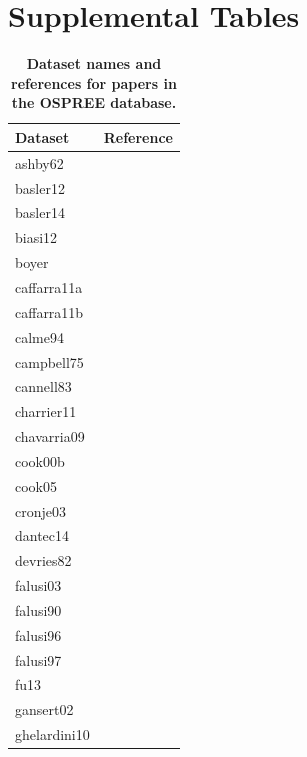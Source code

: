 \documentclass[11pt]{article}
\begin{document}
\section* {Supplemental Tables}
\begin{footnotesize} 

\begingroup\footnotesize
\begin{longtable}{p{}p{}}
\caption{\textbf{Dataset names and references for papers in the OSPREE database.}} \\ 
  \hline
Dataset & Reference \\ 
  \hline \endhead  \hline
ashby62 & \citep{Ashby:1962aa} \\ 
  basler12 & \citep{Basler:2012} \\ 
  basler14 & \citep{Basler:2014aa} \\ 
  biasi12 & \citep{Biasi:2012} \\ 
  boyer & \citep{Boyer:1986} \\ 
  caffarra11a & \citep{Caffarra:2011a} \\ 
  caffarra11b & \citep{Caffarra:2011b} \\ 
  calme94 & \citep{Calme:1994aa} \\ 
  campbell75 & \citep{Campbell:1975aa} \\ 
  cannell83 & \citep{Cannell:1983} \\ 
  charrier11 & \citep{Charrier:2011aa} \\ 
  chavarria09 & \citep{Chavarria:2009aa} \\ 
  cook00b & \citep{Cook:2000aa} \\ 
  cook05 & \citep{Cook:2005aa} \\ 
  cronje03 & \citep{Cronje:2003aa} \\ 
  dantec14 & \citep{Dantec:2014aa} \\ 
  devries82 & \citep{DeVries:1982aa} \\ 
  falusi03 & \citep{Falusi:2003aa} \\ 
  falusi90 & \citep{Falusi:1990aa} \\ 
  falusi96 & \citep{Falusi:1996aa} \\ 
  falusi97 & \citep{Falusi:1997aa} \\ 
  fu13 & \citep{Fu:2013aa} \\ 
  gansert02 & \citep{Gansert:2002aa} \\ 
  ghelardini10 & \citep{Ghelardini:2010aa} \\ 

\end{longtable}
\end{footnotesize}
\end{document}
